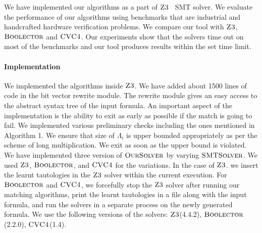 

We have implemented our algorithms as a part of $\textsc{Z3}$~\cite{z3} SMT solver.
%
 We evaluate the performance of our algorithms using benchmarks that are industrial and handcrafted hardware verification problems.
%
We compare our tool with $\textsc{Z3}$, $\textsc{Boolector}$\cite{boolector} and $\textsc{CVC4}$\cite{cvc4}.
%
Our experiments show that the solvers time out on most of the benchmarks and our tool produces results within the set time limit.

\paragraph{\bf Implementation}
We implemented the algorithms inside $\textsc{Z3}$. We have added about 1500 lines of code in the bit vector rewrite module.
%
The rewrite module gives an easy access to the abstract syntax tree of the input formula.
%
An important aspect of the implementation is the ability to exit as early as possible if the match is going to fail.
%
We implemented various preliminary checks including the ones mentioned in Algorithm 1. We ensure that size of $\Lambda_i$ is upper bounded appropriately as per the scheme of long multiplication. We exit as soon as the upper bound is violated. 
%
We have implemented three version of $\textsc{OurSolver}$ by varying
$\textsc{SMTSolver}$.
%
We used  $\textsc{Z3}$, $\textsc{Boolector}$, and $\textsc{CVC4}$ for the variations. 
%
In the case of $\textsc{Z3}$.
we insert the learnt tautologies in the $\textsc{Z3}$ solver within the current execution.
%
For $\textsc{Boolector}$ and $\textsc{CVC4}$,
we forcefully stop the $\textsc{Z3}$ solver after running our matching algorithms,
print the learnt tautologies in a file along with the input formula, and
run the solvers in a separate process on the newly generated formula. We use the following versions of the solvers: $\textsc{Z3}$(4.4.2), $\textsc{Boolector}$(2.2.0), $\textsc{CVC4}$(1.4).

